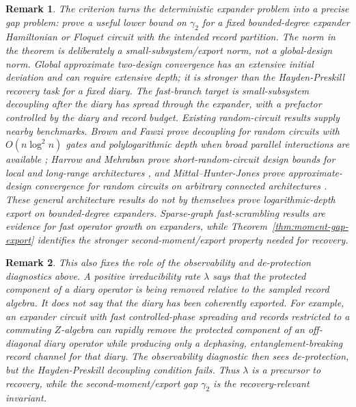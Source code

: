 \documentclass[11pt]{article}
\newtheorem{remark}{Remark}
\begin{document}
\begin{remark}
The criterion turns the deterministic expander problem into a precise
gap problem: prove a useful lower bound on $\gamma_2$ for a fixed
bounded-degree expander Hamiltonian or Floquet circuit with the intended
record partition.  The norm in the theorem is deliberately a
small-subsystem/export norm, not a global-design norm.  Global
approximate two-design convergence has an extensive initial deviation
and can require extensive depth; it is stronger than the
Hayden-Preskill recovery task for a fixed diary.  The fast-branch target
is small-subsystem decoupling after the diary has spread through the
expander, with a prefactor controlled by the diary and record budget.
Existing random-circuit results supply nearby benchmarks.  Brown and
Fawzi prove decoupling for random circuits with $O(n\log^2 n)$ gates and
polylogarithmic depth when broad parallel interactions are available
\citep{Brown2015Decoupling}; Harrow and Mehraban prove
short-random-circuit design bounds for local and long-range
architectures \citep{Harrow2023ShortDesigns}, and Mittal--Hunter-Jones
prove approximate-design convergence for random circuits on arbitrary
connected architectures \citep{Mittal2023ArbitraryDesigns}.  These
general architecture results do not by themselves prove
logarithmic-depth export on bounded-degree expanders.  Sparse-graph
fast-scrambling results are evidence for fast operator growth on
expanders, while
Theorem~\ref{thm:moment-gap-export} identifies the stronger
second-moment/export property needed for recovery.
\end{remark}

\begin{remark}
This also fixes the role of the observability and de-protection
diagnostics above.  A positive irreducibility rate $\lambda$ says that
the protected component of a diary operator is being removed relative to
the sampled record algebra.  It does not say that the diary has been
coherently exported.  For example, an expander circuit with fast
controlled-phase spreading and records restricted to a commuting
$Z$-algebra can rapidly remove the protected component of an off-diagonal
diary operator while producing only a dephasing, entanglement-breaking
record channel for that diary.  The observability diagnostic then sees
de-protection, but the Hayden-Preskill decoupling condition fails.
Thus $\lambda$ is a precursor to recovery, while the
second-moment/export gap $\gamma_2$ is the recovery-relevant invariant.
\end{remark}
\end{document}
